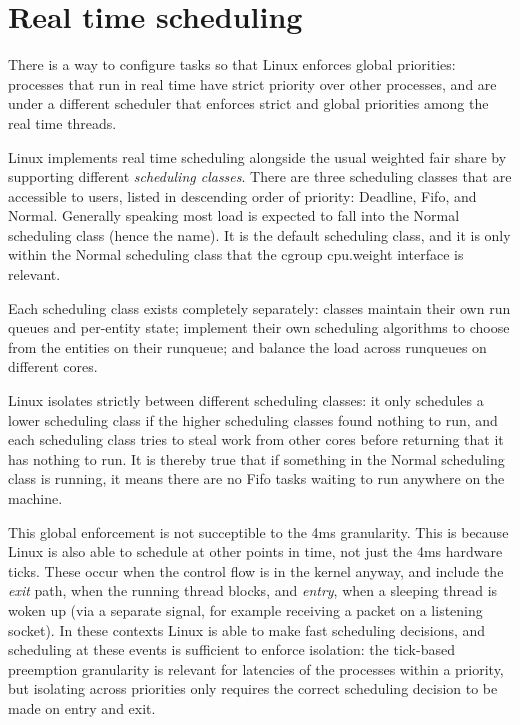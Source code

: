 
\chapter{Real time scheduling}

There is a way to configure tasks so that Linux enforces global priorities:
processes that run in real time have strict priority over other processes, and
are under a different scheduler that enforces strict and global priorities among
the real time threads.

Linux implements real time scheduling alongside the usual weighted fair share by
supporting different \textit{scheduling classes}. There are three scheduling
classes that are accessible to users, listed in descending order of priority:
Deadline, Fifo, and Normal. Generally speaking most load is expected to fall
into the Normal scheduling class (hence the name). It is the default scheduling
class, and it is only within the Normal scheduling class that the cgroup
cpu.weight interface is relevant.

Each scheduling class exists completely separately: classes maintain their own
run queues and per-entity state; implement their own scheduling algorithms to
choose from the entities on their runqueue; and balance the load across
runqueues on different cores.

Linux isolates strictly between different scheduling classes: it only schedules
a lower scheduling class if the higher scheduling classes found nothing to run,
and each scheduling class tries to steal work from other cores before returning
that it has nothing to run. It is thereby true that if something in the Normal
scheduling class is running, it means there are no Fifo tasks waiting to run
anywhere on the machine.

This global enforcement is not succeptible to the 4ms granularity. This is
because Linux is also able to schedule at other points in time, not just the 4ms
hardware ticks. These occur when the control flow is in the kernel anyway, and
include the \textit{exit} path, when the running thread blocks, and
\textit{entry}, when a sleeping thread is woken up (via a separate signal, for
example receiving a packet on a listening socket). In these contexts Linux is
able to make fast scheduling decisions, and scheduling at these events is
sufficient to enforce isolation: the tick-based preemption granularity is
relevant for latencies of the processes within a priority, but isolating across
priorities only requires the correct scheduling decision to be made on entry and
exit. 

